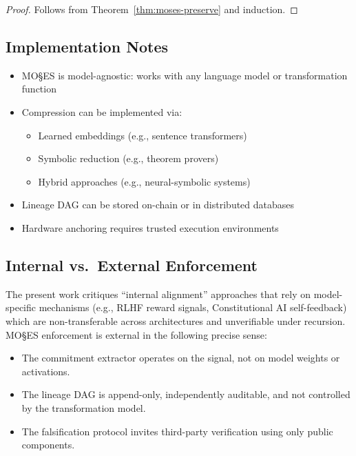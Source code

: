 \documentclass[11pt,a4paper]{article}
\begin{document}
\begin{proof}
Follows from Theorem~\ref{thm:moses-preserve} and induction.
\end{proof}



\subsection{Implementation Notes}

\begin{itemize}
    \item MO\S{}ES\texttrademark{} is model-agnostic: works with any language model or transformation function
    \item Compression can be implemented via:
    \begin{itemize}
        \item Learned embeddings (e.g., sentence transformers)
        \item Symbolic reduction (e.g., theorem provers)
        \item Hybrid approaches (e.g., neural-symbolic systems)
    \end{itemize}
    \item Lineage DAG can be stored on-chain or in distributed databases
    \item Hardware anchoring requires trusted execution environments
\end{itemize}

\subsection{Internal vs.\ External Enforcement}

The present work critiques ``internal alignment'' approaches that rely on model-specific mechanisms (e.g., RLHF reward signals, Constitutional AI self-feedback) which are non-transferable across architectures and unverifiable under recursion. MO\S{}ES\texttrademark{} enforcement is external in the following precise sense:

\begin{itemize}
    \item The commitment extractor operates on the signal, not on model weights or activations.
    \item The lineage DAG is append-only, independently auditable, and not controlled by the transformation model.
    \item The falsification protocol invites third-party verification using only public components.
\end{itemize}
\end{document}
